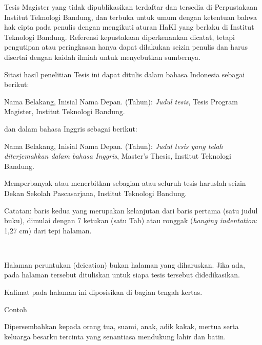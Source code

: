 \documentclass{itb-thesis}
\begin{document}
\cover

\approvalpage

\thesisguide
\begin{onehalfspace}
Tesis Magister yang tidak dipublikasikan terdaftar dan tersedia di Perpustakaan Institut Teknologi Bandung, dan terbuka untuk umum dengan ketentuan bahwa hak cipta pada penulis dengan mengikuti aturan HaKI yang berlaku di Institut Teknologi Bandung. Referensi kepustakaan diperkenankan dicatat, tetapi pengutipan atau peringkasan hanya dapat dilakukan seizin penulis dan harus disertai dengan kaidah ilmiah untuk menyebutkan sumbernya.

\vspace{14pt}

Sitasi hasil penelitian Tesis ini dapat ditulis dalam bahasa Indonesia sebagai berikut:

\begin{hangparas}{1.27cm}{1}
Nama Belakang, Inisial Nama Depan. (Tahun): \textit{Judul tesis}, Tesis Program Magister, Institut Teknologi Bandung.
\end{hangparas}

\vspace{14pt}

dan dalam bahasa Inggris sebagai berikut:

\vspace{14pt}

\begin{hangparas}{1.27cm}{1}
Nama Belakang, Inisial Nama Depan. (Tahun): \textit{Judul tesis yang telah diterjemahkan dalam bahasa Inggris}, Master's Thesis, Institut Teknologi Bandung.
\end{hangparas}

\vspace{14pt}

Memperbanyak atau menerbitkan sebagian atau seluruh tesis haruslah seizin Dekan Sekolah Pascasarjana, Institut Teknologi Bandung.

\vspace{14pt}

Catatan: baris kedua yang merupakan kelanjutan dari baris pertama (satu judul buku), dimulai dengan 7 ketukan (satu Tab) atau ronggak (\textit{hanging indentation}: 1,27 cm) dari tepi halaman.
\end{onehalfspace}

\dedicationpage
\begin{center}
\begin{onehalfspace}
\ 
\vfill
\begin{itshape}
Halaman peruntukan (deication) bukan halaman yang diharuskan. Jika ada, pada halaman tersebut dituliskan untuk siapa tesis tersebut didedikasikan.

Kalimat pada halaman ini diposisikan di bagian tengah kertas.

Contoh

Dipersembahkan kepada orang tua, suami, anak, adik kakak, mertua serta keluarga besarku tercinta yang senantiasa mendukung lahir dan batin.
\end{itshape}
\vfill
\end{onehalfspace}
\end{center}
\end{document}

